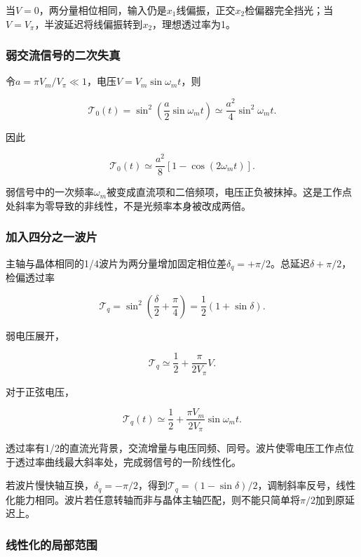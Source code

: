 \documentclass[12pt,a4paper,fontset=fandol]{ctexart}
\begin{document}
当\(V=0\)，两分量相位相同，输入仍是\(x_1\)线偏振，正交\(x_2\)检偏器完全挡光；当\(V=V_\pi\)，半波延迟将线偏振转到\(x_2\)，理想透过率为1。

\subsubsection{弱交流信号的二次失真}\label{ux5f31ux4ea4ux6d41ux4fe1ux53f7ux7684ux4e8cux6b21ux5931ux771f}

令\(a=\pi V_m/V_\pi\ll1\)，电压\(V=V_m\sin\omega_mt\)，则

\[
\mathcal T_0(t)
=\sin^2\left(\frac a2\sin\omega_mt\right)
\simeq\frac{a^2}{4}\sin^2\omega_mt.
\]

因此

\[
\boxed{
\mathcal T_0(t)\simeq
\frac{a^2}{8}[1-\cos(2\omega_mt)]}.
\]

弱信号中的一次频率\(\omega_m\)被变成直流项和二倍频项，电压正负被抹掉。这是工作点处斜率为零导致的非线性，不是光频率本身被改成两倍。

\subsubsection{加入四分之一波片}\label{ux52a0ux5165ux56dbux5206ux4e4bux4e00ux6ce2ux7247}

主轴与晶体相同的1/4波片为两分量增加固定相位差\(\delta_q=+\pi/2\)。总延迟\(\delta+\pi/2\)，检偏透过率

\[
\boxed{
\mathcal T_q
=\sin^2\left(\frac{\delta}{2}+\frac\pi4\right)
=\frac12(1+\sin\delta)}.
\]

弱电压展开，

\[
\boxed{
\mathcal T_q\simeq
\frac12+\frac{\pi}{2V_\pi}V}.
\]

对于正弦电压，

\[
\boxed{
\mathcal T_q(t)\simeq
\frac12+\frac{\pi V_m}{2V_\pi}\sin\omega_mt}.
\]

透过率有1/2的直流光背景，交流增量与电压同频、同号。波片使零电压工作点位于透过率曲线最大斜率处，完成弱信号的一阶线性化。

若波片慢快轴互换，\(\delta_q=-\pi/2\)，得到\(\mathcal T_q=(1-\sin\delta)/2\)，调制斜率反号，线性化能力相同。波片若任意转轴而非与晶体主轴匹配，则不能只简单将\(\pi/2\)加到原延迟上。

\subsubsection{线性化的局部范围}\label{ux7ebfux6027ux5316ux7684ux5c40ux90e8ux8303ux56f4}
\end{document}
